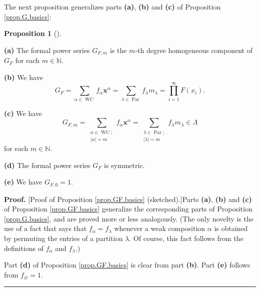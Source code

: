 \documentclass[numbers=enddot,12pt,final,onecolumn,notitlepage]{scrartcl}%
\theoremstyle{definition}
\newtheorem{prop}[theo]{Proposition}
\newenvironment{proposition}[1][]
{\begin{prop}[#1]\begin{leftbar}}
{\end{leftbar}\end{prop}}
\newenvironment{proof}[1][Proof]{\noindent\textbf{#1.} }{\ \rule{0.5em}{0.5em}}
\let\sumnonlimits\sum
\let\prodnonlimits\prod
\renewcommand{\sum}{\sumnonlimits\limits}
\renewcommand{\prod}{\prodnonlimits\limits}
\newenvironment{vershort}{}{}
\begin{document}
The next proposition generalizes parts \textbf{(a)}, \textbf{(b)} and
\textbf{(c)} of Proposition \ref{prop.G.basics}:

\begin{proposition}
\label{prop.GF.basics}\textbf{(a)} The formal power series $G_{F,m}$ is the
$m$-th degree homogeneous component of $G_{F}$ for each $m\in\mathbb{N}$.

\textbf{(b)} We have%
\[
G_{F}=\sum_{\alpha\in\operatorname*{WC}}f_{\alpha}\mathbf{x}^{\alpha}%
=\sum_{\lambda\in\operatorname*{Par}}f_{\lambda}m_{\lambda}=\prod
_{i=1}^{\infty}F\left(  x_{i}\right)  .
\]


\textbf{(c)} We have
\[
G_{F,m}=\sum_{\substack{\alpha\in\operatorname*{WC};\\\left\vert
\alpha\right\vert =m}}f_{\alpha}\mathbf{x}^{\alpha}=\sum_{\substack{\lambda
\in\operatorname*{Par};\\\left\vert \lambda\right\vert =m}}f_{\lambda
}m_{\lambda}\in\Lambda
\]
for each $m\in\mathbb{N}$.

\textbf{(d)} The formal power series $G_{F}$ is symmetric.

\textbf{(e)} We have $G_{F,0}=1$.
\end{proposition}

\begin{vershort}
\begin{proof}
[Proof of Proposition \ref{prop.GF.basics} (sketched).]Parts \textbf{(a)},
\textbf{(b)} and \textbf{(c)} of Proposition \ref{prop.GF.basics} generalize
the corresponding parts of Proposition \ref{prop.G.basics}, and are proved
more or less analogously. (The only novelty is the use of a fact that says
that $f_{\alpha}=f_{\lambda}$ whenever a weak composition $\alpha$ is obtained
by permuting the entries of a partition $\lambda$. Of course, this fact
follows from the definitions of $f_{\alpha}$ and $f_{\lambda}$.)

Part \textbf{(d)} of Proposition \ref{prop.GF.basics} is clear from part
\textbf{(b)}. Part \textbf{(e)} follows from $f_{\varnothing}=1$.
\end{proof}
\end{vershort}
\end{document}
